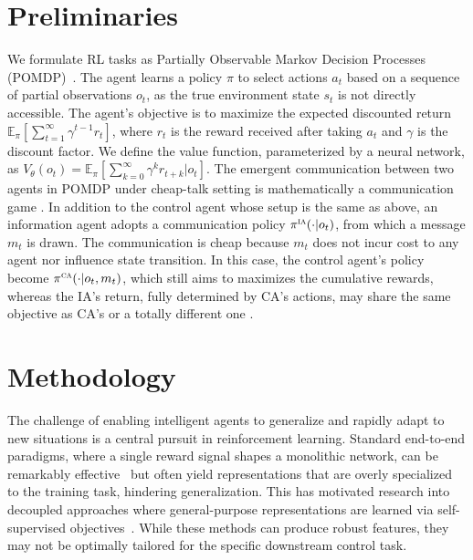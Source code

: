 \documentclass[letterpaper]{article}
\newcommand{\E}{\mathbb{E}}
\begin{document}
\section{Preliminaries}
We formulate RL tasks as Partially Observable Markov Decision Processes (POMDP)~\cite{kaelbling1998planning}. The agent learns a policy $\pi$ to select actions $a_t$ based on a sequence of partial observations $o_t$, as the true environment state $s_t$ is not directly accessible. The agent's objective is to maximize the expected discounted return $\E_{\pi}[\sum_{t=1}^\infty\gamma^{t-1} r_{t}]$, where $r_t$ is the reward received after taking $a_t$ and $\gamma$ is the discount factor. We define the value function, parameterized by a neural network, as  $V_\theta(o_t) =\E_{\pi}[\sum_{k=0}^\infty \gamma^{k}r_{t+k}|o_t ]$.
The emergent communication between two agents in POMDP under cheap-talk setting is mathematically a communication game \cite{crawford82signaling,lowe2019pitfalls, tao23pot, yang-tao25misinformation}. In addition to the control agent whose setup is the same as above, an information agent adopts a communication policy $\pi^{\textsc{ia}}(\cdot|o_t)$, from which a message $m_t$ is drawn. The communication is cheap because $m_t$ does not incur cost to any agent nor influence state transition. In this case, the control agent's policy become $\pi^{\textsc{ca}}(\cdot|o_t, m_t)$, which still aims to maximizes the cumulative rewards, whereas the IA's return, fully determined by CA's actions, may share the same objective as CA's \cite{sukhbaatar16comm} or a totally different one \cite{crawford82signaling, tao23pot}.
\section{Methodology}
The challenge of enabling intelligent agents to generalize and rapidly adapt to new situations is a central pursuit in reinforcement learning. Standard end-to-end paradigms, where a single reward signal shapes a monolithic network, can be remarkably effective~\cite{mnihHumanlevelControlDeep2015} but often yield representations that are overly specialized to the training task, hindering generalization. This has motivated research into decoupled approaches where general-purpose representations are learned via self-supervised objectives~\cite{pmlr-v139-stooke21a, schwarzer2021pretraining}. While these methods can produce robust features, they may not be optimally tailored for the specific downstream control task.
\end{document}
